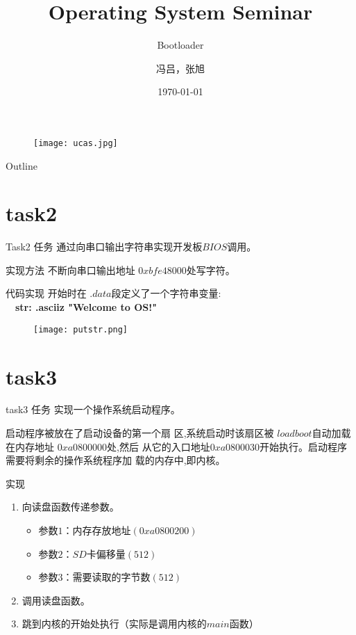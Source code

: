 \documentclass{beamer}
\title{Operating System Seminar}
\subtitle{Bootloader}
\institute{University of Chinese Academy of Sciences}
\author{冯吕，张旭}
\date{\today}
\begin{document}
\begin{frame}
\titlepage
\begin{figure}[ht]\centering\texttt{[image: ucas.jpg]}\end{figure}
\end{frame}

\begin{frame}{Outline}
\tableofcontents
\end{frame}
 
\section{task2}
\begin{frame}{Task2 任务}
通过向串口输出字符串实现开发板$BIOS$调用。

\end{frame}

\begin{frame}{实现方法}
不断向串口输出地址 $0xbfe48000$处写字符。
\end{frame}

\begin{frame}{代码实现}
开始时在 $.data$段定义了一个字符串变量:\\　\textbf{str: .asciiz "Welcome to OS!"}

\begin{figure}

	\centering\texttt{[image: putstr.png]}
\end{figure}
\end{frame}

\section{task3}
\begin{frame}{task3 任务}
实现一个操作系统启动程序。	

启动程序被放在了启动设备的第一个扇
区,系统启动时该扇区被 $loadboot $自动加载在内存地址 $0xa0800000 $处,然后
从它的入口地址$ 0xa0800030 $开始执行。启动程序需要将剩余的操作系统程序加
载的内存中,即内核。	
\end{frame}

\begin{frame}{实现}
\begin{enumerate}
	\item 向读盘函数传递参数。
	\begin{itemize}
		\item 参数$1$：内存存放地址$(0xa0800200)$
		\item 参数$2$：$SD$卡偏移量$(512)$
		\item 参数$3$：需要读取的字节数$(512)$
	\end{itemize}
	\item 调用读盘函数。
	\item 跳到内核的开始处执行（实际是调用内核的$main$函数）
\end{enumerate}
\end{frame}
\end{document}
